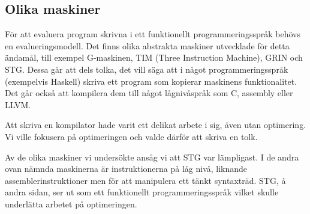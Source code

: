 \documentclass[../Core]{subfiles}
\begin{document}
\subsection{Olika maskiner}
För att evaluera program skrivna i ett funktionellt programmeringsspråk
behövs en evalueringsmodell. Det finns olika abstrakta maskiner utvecklade för
detta ändamål, till exempel G-maskinen, TIM (Three Instruction Machine), GRIN och STG.
Dessa går att dels tolka, det vill säga att i något programmeringsspråk (exempelvis
Haskell) skriva ett program som kopierar maskinens funktionalitet. Det går också att
kompilera dem till något lågnivåspråk som C, assembly eller LLVM.

Att skriva en kompilator hade varit ett delikat arbete i sig, även utan
optimering. Vi ville fokusera på optimeringen och valde därför att skriva en tolk.

Av de olika maskiner vi undersökte
ansåg vi att STG var lämpligast. I de andra ovan nämnda maskinerna är
instruktionerna på låg nivå, liknande assemblerinstruktioner men för att manipulera
ett tänkt syntaxträd. STG, å andra sidan, ser ut som ett funktionellt
programmeringsspråk vilket skulle underlätta arbetet på optimeringen.

\end{document}
